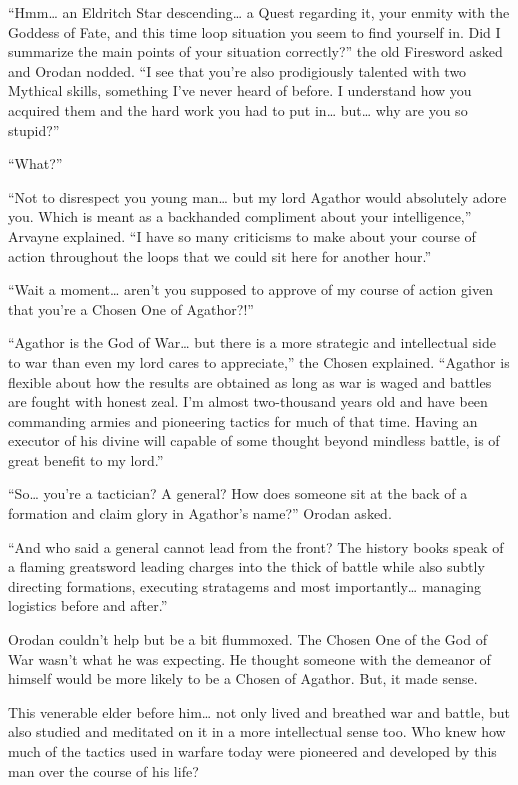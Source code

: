 \documentclass[a4paper,10pt]{book}
\begin{document}
“Hmm… an Eldritch Star descending… a Quest regarding it, your enmity with the Goddess of Fate, and this time loop situation you seem to find yourself in. Did I summarize the main points of your situation correctly?” the old Firesword asked and Orodan nodded. “I see that you’re also prodigiously talented with two Mythical skills, something I’ve never heard of before. I understand how you acquired them and the hard work you had to put in… but… why are you so stupid?”\par
“What?”\par
“Not to disrespect you young man… but my lord Agathor would absolutely adore you. Which is meant as a backhanded compliment about your intelligence,” Arvayne explained. “I have so many criticisms to make about your course of action throughout the loops that we could sit here for another hour.”\par
“Wait a moment… aren’t you supposed to approve of my course of action given that you’re a Chosen One of Agathor?!”\par
“Agathor is the God of War… but there is a more strategic and intellectual side to war than even my lord cares to appreciate,” the Chosen explained. “Agathor is flexible about how the results are obtained as long as war is waged and battles are fought with honest zeal. I’m almost two-thousand years old and have been commanding armies and pioneering tactics for much of that time. Having an executor of his divine will capable of some thought beyond mindless battle, is of great benefit to my lord.”\par
“So… you’re a tactician? A general? How does someone sit at the back of a formation and claim glory in Agathor’s name?” Orodan asked.\par
“And who said a general cannot lead from the front? The history books speak of a flaming greatsword leading charges into the thick of battle while also subtly directing formations, executing stratagems and most importantly… managing logistics before and after.”\par
Orodan couldn’t help but be a bit flummoxed. The Chosen One of the God of War wasn’t what he was expecting. He thought someone with the demeanor of himself would be more likely to be a Chosen of Agathor. But, it made sense.\par
This venerable elder before him… not only lived and breathed war and battle, but also studied and meditated on it in a more intellectual sense too. Who knew how much of the tactics used in warfare today were pioneered and developed by this man over the course of his life?\par
\end{document}
